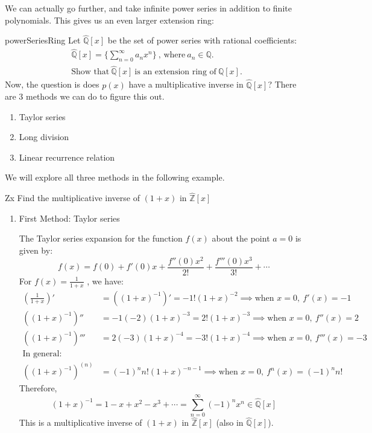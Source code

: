 We can actually go further, and take infinite power series in addition to finite polynomials. This gives us an even larger extension ring:

\begin{example}{powerSeriesRing}
Let $\widehat{{\mathbb Q}}[x]$ be the set of power series with rational coefficients:
\begin{align*}
\widehat{{\mathbb Q}}[x]=\{\sum_{n=0}^{\infty}a_n x^n\}~\text{, where}~a_n\in {\mathbb Q}.\\  
\text{Show that}~ \widehat{{\mathbb Q}}[x]~\text{is an extension ring of}~{\mathbb Q}[x].
\end{align*}
Now, the question is does $p(x)$ have a multiplicative inverse in $\widehat{{\mathbb Q}}[x]$? There are 3 methods we can do to figure this out.
\begin{enumerate}
\item Taylor series
\item Long division
\item Linear recurrence relation
\end{enumerate}

We will explore all three methods in the following example.

\begin{example}{Zx}
Find the multiplicative inverse of $(1+x)$ in $\widehat{{\mathbb Z}}[x]$\\

\begin{enumerate}
\item First Method: Taylor series

The Taylor series expansion for the function $f(x)$ about the point $a=0$ is given by:
\begin{equation*}{}
f(x)=f(0)+f'(0)x+\frac{f''(0)x^2}{2!}+\frac{f'''(0)x^3}{3!}+\cdots
\end{equation*}
For $f(x)=\frac{1}{1+x}$ , we have:
\begin{align*}
\left(\frac{1}{1+x}\right)'&=((1+x)^{-1})'=-1!(1+x)^{-2}\implies \text{when $x=0,~f'(x)=-1$}\\
((1+x)^{-1})''&=-1(-2)(1+x)^{-3}=2!(1+x)^{-3}\implies \text{when $x=0,~f''(x)=2$}\\
((1+x)^{-1})'''&=2(-3)(1+x)^{-4}=-3!(1+x)^{-4} \implies \text{when $x=0,~f'''(x)=-3$}\\
\text{In general:} \\
((1+x)^{-1})^{(n)}&=(-1)^{n}n!(1+x)^{-n-1} \implies \text{when $x=0,~f^n(x)=(-1)^{n}n!$}
\end{align*}
Therefore,
\begin{equation}
(1+x)^{-1}=1-x+x^2-x^3+\cdots=\sum_{n=0}^{\infty}(-1)^nx^n\in \widehat{{\mathbb Q}}[x]
\end{equation}
This is a multiplicative inverse of $(1+x)$ in $\widehat{{\mathbb Z}}[x]$ (also in $\widehat{{\mathbb Q}}[x]$).


\end{enumerate}
\end{example}
\end{example}
